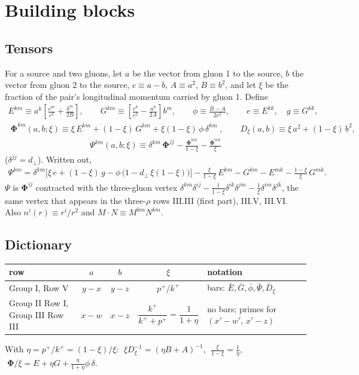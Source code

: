\documentclass[10pt]{article}
\numberwithin{equation}{section}
\begin{document}
\section{Building blocks}

\subsection{Tensors}
For a source and two gluons, let $a$ be the vector from gluon 1 to the source, $b$ the vector from gluon 2 to the source, $c\equiv a-b$, $A\equiv a^{2}$, $B\equiv b^{2}$, and let $\xi$ be the fraction of the pair's longitudinal momentum carried by gluon 1. Define
\begin{align}
E^{km}\equiv a^{k}\left[\frac{c^{m}}{c^{2}}+\frac{b^{m}}{2B}\right],\qquad
G^{km}\equiv\left[\frac{c^{k}}{c^{2}}-\frac{a^{k}}{2A}\right]b^{m},\qquad
\phi\equiv\frac{B-A}{2c^{2}},\qquad e\equiv E^{kk},\quad g\equiv G^{kk},
\end{align}
\begin{align}
\boxed{\;\mathbf{\Phi}^{km}(a,b;\xi)\equiv\xi\,E^{km}+(1-\xi)\,G^{km}+\xi(1-\xi)\,\phi\,\delta^{km}\;},\qquad
D_{\xi}(a,b)\equiv\xi\,a^{2}+(1-\xi)\,b^{2}, \label{eq:Phi}
\end{align}
\begin{align}
\boxed{\;\Psi^{km}(a,b;\xi)\equiv\delta^{km}\,\mathbf{\Phi}^{jj}-\frac{\mathbf{\Phi}^{km}}{1-\xi}-\frac{\mathbf{\Phi}^{mk}}{\xi}\;} \label{eq:Psi}
\end{align}
($\delta^{jj}=d_{\perp}$). Written out,
\begin{align}
\Psi^{km}=\delta^{km}\Big[\xi\,e+(1-\xi)\,g-\phi\,\big(1-d_{\perp}\,\xi(1-\xi)\big)\Big]-\frac{\xi}{1-\xi}\,E^{km}-G^{km}-E^{mk}-\frac{1-\xi}{\xi}\,G^{mk}. \label{eq:Psiexp}
\end{align}
$\Psi$ is $\mathbf{\Phi}^{ij}$ contracted with the three-gluon vertex $\delta^{km}\delta^{ij}-\frac{1}{1-\xi}\delta^{ik}\delta^{jm}-\frac{1}{\xi}\delta^{im}\delta^{jk}$, the same vertex that appears in the three-$\rho$ rows III.III (first part), III.V, III.VI. Also $n^{i}(r)\equiv r^{i}/r^{2}$ and $M\cdot N\equiv M^{km}N^{km}$.

\subsection{Dictionary}
\begin{center}
\renewcommand{\arraystretch}{1.3}
\begin{tabular}{l|c|c|c|l}
row & $a$ & $b$ & $\xi$ & notation\\ \hline
Group I, Row V & $y-x$ & $y-z$ & $p^{+}/k^{+}$ & bars: $\bar E,\bar G,\bar\phi,\bar\Psi,\bar D_{\xi}$\\
Group II Row I, Group III Row III & $x-w$ & $x-z$ & $\dfrac{k^{+}}{k^{+}+p^{+}}=\dfrac{1}{1+\eta}$ & no bars; primes for $(x'-w',\,x'-z)$
\end{tabular}
\end{center}
With $\eta=p^{+}/k^{+}=(1-\xi)/\xi$: $\;\xi D_{\xi}^{-1}=(\eta B+A)^{-1}$, $\;\frac{\xi}{1-\xi}=\frac1\eta$, $\;\mathbf{\Phi}/\xi=E+\eta G+\frac{\eta}{1+\eta}\phi\,\delta$.
\end{document}
